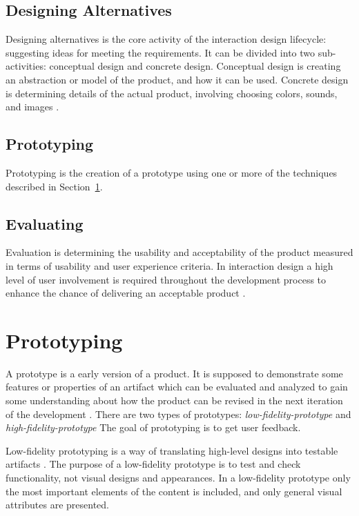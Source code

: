 \documentclass[../Main/thesis.tex]{subfiles}
\begin{document}
\subsection{Designing Alternatives}
Designing alternatives is the core activity of the interaction design lifecycle: suggesting ideas for meeting the requirements.
It can be divided into two sub-activities: conceptual design and concrete design.
Conceptual design is creating an abstraction or model of the product, and how it can be used.
Concrete design is determining details of the actual product, involving choosing colors, sounds, and images \citep{Preece2011}.

\subsection{Prototyping}
Prototyping is the creation of a prototype using one or more of the techniques described in Section~\ref{sec:prototyping}.

\subsection{Evaluating}
Evaluation is determining the usability and acceptability of the product measured in terms of usability and user experience criteria.
In interaction design a high level of user involvement is required throughout the development process to enhance the chance of delivering an acceptable product \citep{Preece2011}.

\section{Prototyping}
\label{sec:prototyping}
A prototype is a early version of a product. 
It is supposed to demonstrate some features or properties of an artifact which can be evaluated and analyzed to gain some understanding about how the product can be revised in the next iteration of the development \citep{oates2005researching}.
There are two types of prototypes: \textit{low-fidelity-prototype} and \textit{high-fidelity-prototype}
The goal of prototyping is to get user feedback.

Low-fidelity prototyping is a way of translating high-level designs into testable artifacts \citep{Babich2017}.
The purpose of a low-fidelity prototype is to test and check functionality, not visual designs and appearances.
In a low-fidelity prototype only the most important elements of the content is included, and only general visual attributes are presented.
\end{document}
